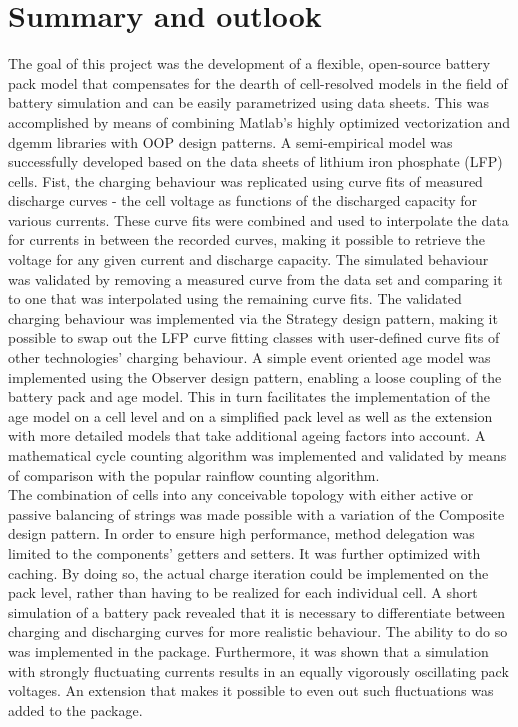 \section{Summary and outlook}
The goal of this project was the development of a flexible, open-source battery pack model that compensates for the dearth of cell-resolved models in the field of battery simulation and can be easily parametrized using data sheets. This was accomplished by means of combining Matlab's highly optimized vectorization and dgemm libraries with OOP design patterns.
A semi-empirical model was successfully developed based on the data sheets of lithium iron phosphate (LFP) cells. Fist, the charging behaviour was replicated using curve fits of measured discharge curves - the cell voltage as functions of the discharged capacity for various currents. These curve fits were combined and used to interpolate the data for currents in between the recorded curves, making it possible to retrieve the voltage for any given current and discharge capacity. The simulated behaviour was validated by removing a measured curve from the data set and comparing it to one that was interpolated using the remaining curve fits. The validated charging behaviour was implemented via the Strategy design pattern, making it possible to swap out the LFP curve fitting classes with user-defined curve fits of other technologies' charging behaviour. A simple event oriented age model was implemented using the Observer design pattern, enabling a loose coupling of the battery pack and age model. This in turn facilitates the implementation of the age model on a cell level and on a simplified pack level as well as the extension with more detailed models that take additional ageing factors into account. A mathematical cycle counting algorithm was implemented and validated by means of comparison with the popular rainflow counting algorithm. \\
The combination of cells into any conceivable topology with either active or passive balancing of strings was made possible with a variation of the Composite design pattern. In order to ensure high performance, method delegation was limited to the components' getters and setters. It was further optimized with caching. By doing so, the actual charge iteration could be implemented on the pack level, rather than having to be realized for each individual cell. A short simulation of a battery pack revealed that it is necessary to differentiate between charging and discharging curves for more realistic behaviour. The ability to do so was implemented in the package. Furthermore, it was shown that a simulation with strongly fluctuating currents results in an equally vigorously oscillating pack voltages. An extension that makes it possible to even out such fluctuations was added to the package.\\ 
